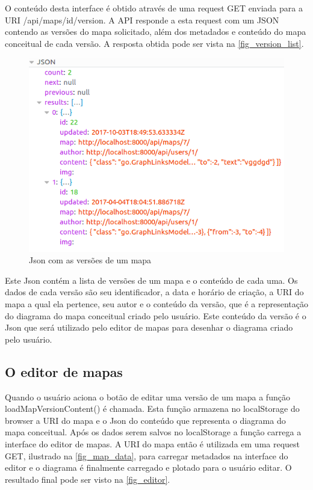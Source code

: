 \documentclass[
	12pt,				%
	openright,			%
	oneside,			%
	a4paper,			%
	english,			%
	french,				%
	spanish,			%
	brazil				%
	]{abntex2}
\begin{document}
O conteúdo desta interface é obtido através de uma request GET enviada para a URI /api/maps/id/version. A API responde a esta request com um JSON contendo as versões do mapa solicitado, além dos metadados e conteúdo do mapa conceitual de cada versão. A resposta obtida pode ser vista na \autoref{fig_version_list}. 

\begin{figure}[htb]
	\caption{\label{fig_version_list} Json com as versões de um mapa}
	\begin{center}
		\includegraphics[scale=0.6]{version_list.png}
	\end{center}
\end{figure} 

Este Json contém a lista de versões de um mapa e o conteúdo de cada uma. Os dados de cada versão são seu identificador, a data e horário de criação, a URI do mapa a qual ela pertence, seu autor e o conteúdo da versão, que é a representação do diagrama do mapa conceitual criado pelo usuário. Este conteúdo da versão é o Json que será utilizado pelo editor de mapas para desenhar o diagrama criado pelo usuário.

\subsection{O editor de mapas}

Quando o usuário aciona o botão de editar uma versão de um mapa a função loadMapVersionContent() é chamada. Esta função armazena no localStorage do browser a URI do mapa e o Json do conteúdo que representa o diagrama do mapa conceitual. Após os dados serem salvos no localStorage a função carrega a interface do editor de mapas. A URI do mapa então é utilizada em uma request GET, ilustrado na \autoref{fig_map_data}, para carregar metadados na interface do editor e o diagrama é finalmente carregado e plotado para o usuário editar. O resultado final pode ser visto na \autoref{fig_editor}.
\end{document}
